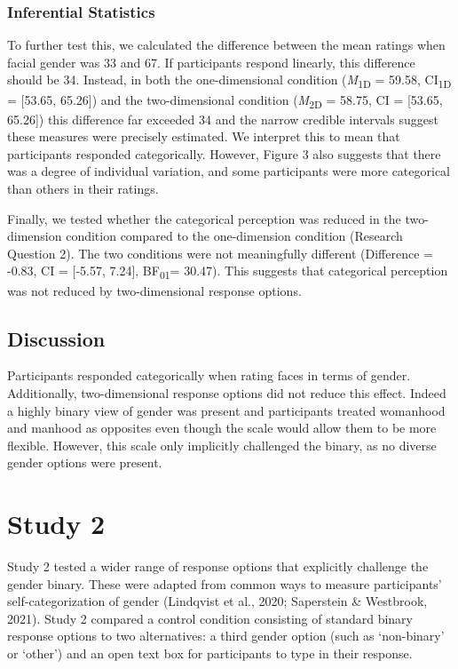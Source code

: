 \documentclass[
  man,
  longtable,
  nolmodern,
  notxfonts,
  notimes,
  colorlinks=true,linkcolor=blue,citecolor=blue,urlcolor=blue]{apa7}
\begin{document}
\subsubsection{Inferential Statistics}\label{inferential-statistics}

To further test this, we calculated the difference between the mean
ratings when facial gender was 33 and 67. If participants respond
linearly, this difference should be 34. Instead, in both the
one-dimensional condition (\emph{M}\textsubscript{1D} = 59.58,
CI\textsubscript{1D} = {[}53.65, 65.26{]}) and the two-dimensional
condition (\emph{M}\textsubscript{2D} = 58.75, CI = {[}53.65, 65.26{]})
this difference far exceeded 34 and the narrow credible intervals
suggest these measures were precisely estimated. We interpret this to
mean that participants responded categorically. However, Figure 3 also
suggests that there was a degree of individual variation, and some
participants were more categorical than others in their ratings.

Finally, we tested whether the categorical perception was reduced in the
two-dimension condition compared to the one-dimension condition
(Research Question 2). The two conditions were not meaningfully
different (Difference = -0.83, CI = {[}-5.57, 7.24{]},
BF\textsubscript{01}= 30.47). This suggests that categorical perception
was not reduced by two-dimensional response options.

\subsection{Discussion}\label{discussion}

Participants responded categorically when rating faces in terms of
gender. Additionally, two-dimensional response options did not reduce
this effect. Indeed a highly binary view of gender was present and
participants treated womanhood and manhood as opposites even though the
scale would allow them to be more flexible. However, this scale only
implicitly challenged the binary, as no diverse gender options were
present.

\section{Study 2}\label{study-2}

Study 2 tested a wider range of response options that explicitly
challenge the gender binary. These were adapted from common ways to
measure participants' self-categorization of gender (Lindqvist et al.,
2020; Saperstein \& Westbrook, 2021). Study 2 compared a control
condition consisting of standard binary response options to two
alternatives: a third gender option (such as `non-binary' or `other')
and an open text box for participants to type in their response.
\end{document}
